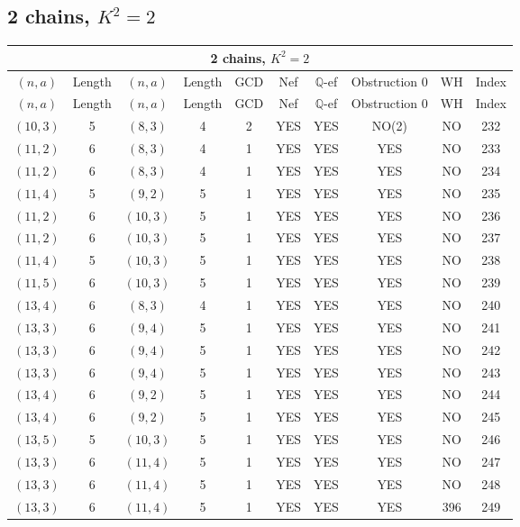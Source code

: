 \subsection{2 chains, $K^2 = 2$}
\begin{longtable}{|c|c|c|c|c|c|c|c|c|c|}
\hline
\multicolumn{10}{|c|}{2 chains, $K^2 = 2$}\\
\hline
$(n,a)$ & Length & $(n,a)$ & Length & GCD & Nef & $\mathbb Q$-ef & Obstruction 0 & WH & Index\\
\hline
\endfirsthead

\hline
$(n,a)$ & Length & $(n,a)$ & Length & GCD & Nef & $\mathbb Q$-ef & Obstruction 0 & WH & Index\\
\hline
\endhead
\hline
\endfoot

$(10, 3)$ & 5 & $(8, 3)$ & 4 & 2 & YES & YES & NO(2) & NO & 232\\
$(11, 2)$ & 6 & $(8, 3)$ & 4 & 1 & YES & YES & YES & NO & 233\\
$(11, 2)$ & 6 & $(8, 3)$ & 4 & 1 & YES & YES & YES & NO & 234\\
$(11, 4)$ & 5 & $(9, 2)$ & 5 & 1 & YES & YES & YES & NO & 235\\
$(11, 2)$ & 6 & $(10, 3)$ & 5 & 1 & YES & YES & YES & NO & 236\\
$(11, 2)$ & 6 & $(10, 3)$ & 5 & 1 & YES & YES & YES & NO & 237\\
$(11, 4)$ & 5 & $(10, 3)$ & 5 & 1 & YES & YES & YES & NO & 238\\
$(11, 5)$ & 6 & $(10, 3)$ & 5 & 1 & YES & YES & YES & NO & 239\\
$(13, 4)$ & 6 & $(8, 3)$ & 4 & 1 & YES & YES & YES & NO & 240\\
$(13, 3)$ & 6 & $(9, 4)$ & 5 & 1 & YES & YES & YES & NO & 241\\
$(13, 3)$ & 6 & $(9, 4)$ & 5 & 1 & YES & YES & YES & NO & 242\\
$(13, 3)$ & 6 & $(9, 4)$ & 5 & 1 & YES & YES & YES & NO & 243\\
$(13, 4)$ & 6 & $(9, 2)$ & 5 & 1 & YES & YES & YES & NO & 244\\
$(13, 4)$ & 6 & $(9, 2)$ & 5 & 1 & YES & YES & YES & NO & 245\\
$(13, 5)$ & 5 & $(10, 3)$ & 5 & 1 & YES & YES & YES & NO & 246\\
$(13, 3)$ & 6 & $(11, 4)$ & 5 & 1 & YES & YES & YES & NO & 247\\
$(13, 3)$ & 6 & $(11, 4)$ & 5 & 1 & YES & YES & YES & NO & 248\\
$(13, 3)$ & 6 & $(11, 4)$ & 5 & 1 & YES & YES & YES & 396 & 249\\

\end{longtable}
